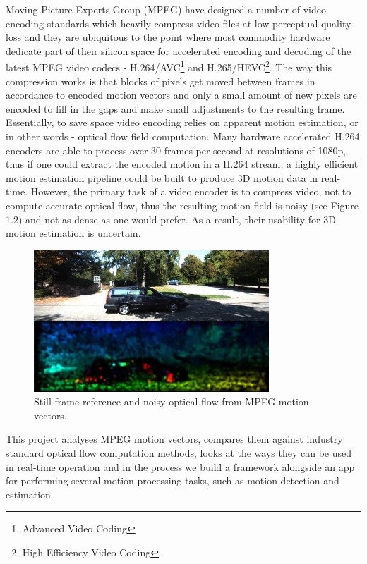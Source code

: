 \documentclass[11pt,english]{report}
\begin{document}
Moving Picture Experts Group (MPEG) have designed a number of video encoding standards which heavily compress video files at low perceptual quality loss and they are ubiquitous to the point where most commodity hardware dedicate part of their silicon space for accelerated encoding and decoding of the latest MPEG video codecs - H.264/AVC\footnote{Advanced Video Coding}\cite{h264} and H.265/HEVC\footnote{High Efficiency Video Coding}\cite{h265}. The way this compression works is that blocks of pixels get moved between frames in accordance to encoded motion vectors and only a small amount of new pixels are encoded to fill in the gaps and make small adjustments to the resulting frame. Essentially, to save space video encoding relies on apparent motion estimation, or in other words - optical flow field computation. Many hardware accelerated H.264 encoders are able to process over 30 frames per second at resolutions of 1080p, thus if one could extract the encoded motion in a H.264 stream, a highly efficient motion estimation pipeline could be built to produce 3D motion data in real-time. However, the primary task of a video encoder is to compress video, not to compute accurate optical flow, thus the resulting motion field is noisy\cite{1334181} (see Figure 1.2) and not as dense as one would prefer. As a result, their usability for 3D motion estimation is uncertain.

\begin{figure}[!ht]
	\centering
	\includegraphics[width=250pt]{docs/report/mpeg-mvecs.jpg}
	\caption{\centering Still frame reference and noisy optical flow from MPEG motion vectors.}
\end{figure}

This project analyses MPEG motion vectors, compares them against industry standard optical flow computation methods, looks at the ways they can be used in real-time operation and in the process we build a framework alongside an app for performing several motion processing tasks, such as motion detection and estimation.
\end{document}
